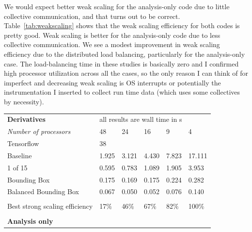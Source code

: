 \documentclass[11pt,letterpaper]{article}
\begin{document}
\qquad We would expect better weak scaling for the analysis-only code due to little collective communication, and that turns out to be correct.
Table~\ref{tab:weakscaling} shows that the weak scaling efficiency for both codes is pretty good.
Weak scaling is better for the analysis-only code due to less collective communication.
We see a modest improvement in weak scaling efficiency due to the distributed load balancing, particularly for the analysis-only case.
The load-balancing time in these studies is basically zero and I confirmed high processor utilization across all the cases, so the only reason I can think of for imperfect and decreasing weak scaling is OS interrupts or potentially the instrumentation I inserted to collect run time data (which uses some collectives by necessity).

\begin{table}[!hbt]
  \centering
  \begin{tabular}{llllll}
  \textbf{Derivatives}                                & \multicolumn{5}{l}{all results are wall time in s} \\
  \textit{Number of processors}                       & 48       & 24       & 16      & 9       & 4        \\ \cline{2-6}
  \multicolumn{1}{l|}{Tensorflow}                     & 38       &          &         &         &          \\
  \multicolumn{1}{l|}{Baseline}                       & 1.925    & 3.121    & 4.430   & 7.823   & 17.111   \\
  \multicolumn{1}{l|}{1 of 15}                        & 0.595    & 0.783    & 1.089   & 1.905   & 3.953    \\
  \multicolumn{1}{l|}{Bounding Box}                     & 0.175    & 0.169    & 0.175   & 0.224   & 0.282    \\
  \multicolumn{1}{l|}{Balanced Bounding Box}                    & 0.067    & 0.050    & 0.052   & 0.076   & 0.140    \\
  \multicolumn{1}{l|}{}                               &          &          &         &         &          \\
  \multicolumn{1}{l|}{Best strong scaling efficiency} & 17\%     & 46\%     & 67\%    & 82\%    & 100\%    \\
                                                      &          &          &         &         &          \\
  \textbf{Analysis only}                              & \multicolumn{5}{l}{} \\

\end{tabular}
\end{table}
\end{document}
